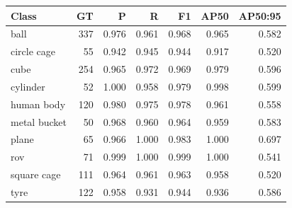 \begin{tabular}{lrrrrrr}
\toprule
Class & GT & P & R & F1 & AP50 & AP50:95 \\
\midrule
ball & 337 & 0.976 & 0.961 & 0.968 & 0.965 & 0.582 \\
circle cage & 55 & 0.942 & 0.945 & 0.944 & 0.917 & 0.520 \\
cube & 254 & 0.965 & 0.972 & 0.969 & 0.979 & 0.596 \\
cylinder & 52 & 1.000 & 0.958 & 0.979 & 0.998 & 0.599 \\
human body & 120 & 0.980 & 0.975 & 0.978 & 0.961 & 0.558 \\
metal bucket & 50 & 0.968 & 0.960 & 0.964 & 0.959 & 0.583 \\
plane & 65 & 0.966 & 1.000 & 0.983 & 1.000 & 0.697 \\
rov & 71 & 0.999 & 1.000 & 0.999 & 1.000 & 0.541 \\
square cage & 111 & 0.964 & 0.961 & 0.963 & 0.958 & 0.520 \\
tyre & 122 & 0.958 & 0.931 & 0.944 & 0.936 & 0.586 \\
\bottomrule
\end{tabular}
